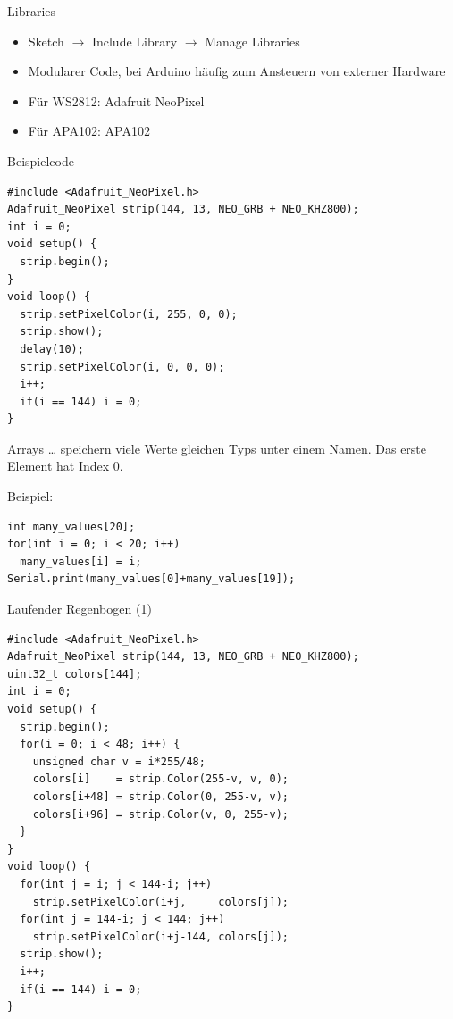 \documentclass[bigger]{beamer}
\begin{document}
\begin{frame}[label={sec:org9008bf3}]{Libraries}
\begin{itemize}
\item Sketch \(\rightarrow\) Include Library \(\rightarrow\) Manage Libraries
\item Modularer Code, bei Arduino häufig zum Ansteuern von externer Hardware
\item Für WS2812: Adafruit NeoPixel
\item Für APA102: APA102
\end{itemize}
\end{frame}

\begin{frame}[fragile,label={sec:orgfa7e28b}]{Beispielcode}
 \begin{verbatim}
#include <Adafruit_NeoPixel.h>
Adafruit_NeoPixel strip(144, 13, NEO_GRB + NEO_KHZ800);
int i = 0;
void setup() {
  strip.begin();
}
void loop() {
  strip.setPixelColor(i, 255, 0, 0);
  strip.show();
  delay(10);
  strip.setPixelColor(i, 0, 0, 0);
  i++;
  if(i == 144) i = 0;
}
\end{verbatim}
\end{frame}

\begin{frame}[fragile,label={sec:org68a430b}]{Arrays}
 \ldots{} speichern viele Werte gleichen Typs unter einem Namen. Das erste
Element hat Index 0.

Beispiel:
\begin{verbatim}
int many_values[20];
for(int i = 0; i < 20; i++)
  many_values[i] = i;
Serial.print(many_values[0]+many_values[19]);
\end{verbatim}
\end{frame}

\begin{frame}[fragile,label={sec:orgace879a}]{Laufender Regenbogen (1)}
\begin{verbatim}
#include <Adafruit_NeoPixel.h>
Adafruit_NeoPixel strip(144, 13, NEO_GRB + NEO_KHZ800);
uint32_t colors[144];
int i = 0;
void setup() {
  strip.begin();
  for(i = 0; i < 48; i++) {
    unsigned char v = i*255/48;
    colors[i]    = strip.Color(255-v, v, 0);
    colors[i+48] = strip.Color(0, 255-v, v);
    colors[i+96] = strip.Color(v, 0, 255-v);
  }
}
void loop() {
  for(int j = i; j < 144-i; j++)
    strip.setPixelColor(i+j,     colors[j]);
  for(int j = 144-i; j < 144; j++)
    strip.setPixelColor(i+j-144, colors[j]);
  strip.show();
  i++;
  if(i == 144) i = 0;
}
\end{verbatim}
\end{frame}
\end{document}
